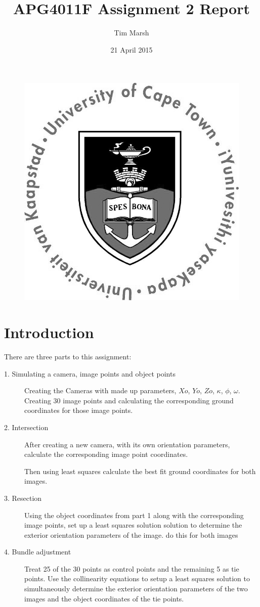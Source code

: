 \documentclass[11pt,a4paper]{article}
\title{APG4011F Assignment 2 Report}
\date{21 April 2015}
\author{Tim Marsh}
\begin{document}
	
	\maketitle
	\begin{figure}[H]
		\centering
		\includegraphics[width=0.7\linewidth]{./UCTcircular_logo1_CMYK}
		\label{fig:UCTcircular_logo1_CMYK}
	\end{figure}
	\newpage
	\tableofcontents
	\listoffigures
	\newpage
	
	
	\section{Introduction}
	
	There are three parts to this assignment:
	
	\begin{description}
			\item[1. Simulating a camera, image points and object points] Creating the Cameras with made up parameters, $Xo$, $Yo$, $Zo$, $\kappa$, $\phi$, $\omega$. Creating 30 image points and calculating the corresponding ground coordinates for those image points.
			
			\item[2. Intersection] After creating a new camera, with its own orientation parameters, calculate the corresponding image point coordinates.
			
			Then using least squares calculate the best fit ground coordinates for both images.
			
			\item[3. Resection] Using the object coordinates from part 1 along with the corresponding image points, set up a least squares solution solution to determine the exterior orientation parameters of the image. do this for both images
			
			\item[4. Bundle adjustment] Treat 25 of the 30 points as control points and the remaining 5 as tie points. Use the collinearity equations to setup a least squares solution to simultaneously determine the exterior orientation parameters of the two images and the object coordinates of the tie points.
			
	\end{description}
	
\end{document}
